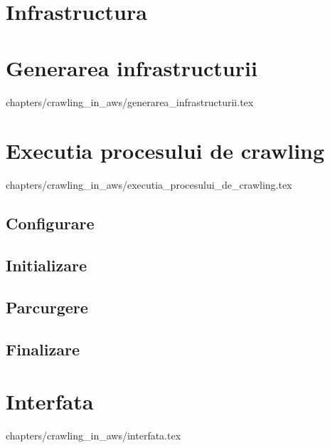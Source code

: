 \documentclass[12pt,oneside]{report}
\begin{document}
\setcounter{section}{0}

\section{Infrastructura}

\clearpage

\section{Generarea infrastructurii}
 {
	chapters/crawling_in_aws/generarea_infrastructurii.tex
}
\clearpage

\section{Executia procesului de crawling}
 {
	chapters/crawling_in_aws/executia_procesului_de_crawling.tex
}

\subsection{Configurare}

\clearpage

\subsection{Initializare}


\subsection{Parcurgere}


\subsection{Finalizare}

\clearpage

\section{Interfata}
 {
	chapters/crawling_in_aws/interfata.tex
}


\end{document}
